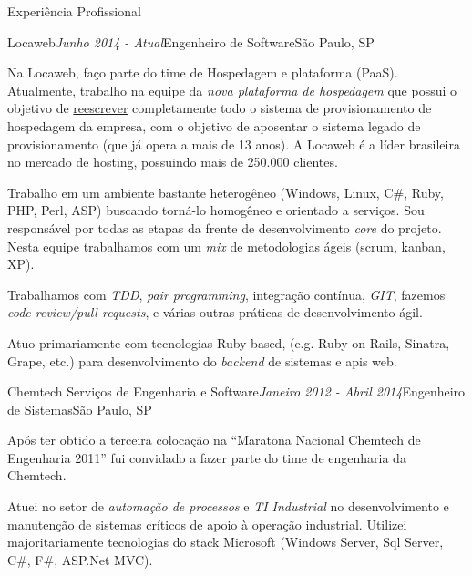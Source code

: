 \documentclass{resume} %
\begin{document}
\begin{rSection}{Experiência Profissional}
  \begin{rSubsection}{Locaweb}{\em Junho 2014 - Atual}{Engenheiro de Software}{São
      Paulo, SP}

  \item Na Locaweb, faço parte do time de Hospedagem e plataforma (PaaS).
    Atualmente, trabalho na equipe da {\em nova plataforma de hospedagem} que
    possui o objetivo de \underline{reescrever} completamente todo o sistema de
    provisionamento de hospedagem da empresa, com o objetivo de aposentar o
    sistema legado de provisionamento (que já opera a mais de 13 anos). A
    Locaweb é a líder brasileira no mercado de hosting, possuindo mais de
    250.000 clientes.

  \item Trabalho em um ambiente bastante heterogêneo (Windows, Linux, C\#, Ruby,
    PHP, Perl, ASP) buscando torná-lo homogêneo e orientado a serviços. Sou
    responsável por todas as etapas da frente de desenvolvimento {\em core} do
    projeto. Nesta equipe trabalhamos com um {\em mix} de metodologias ágeis
    (scrum, kanban, XP).

  \item Trabalhamos com {\em TDD}, {\em pair programming}, integração contínua,
    {\em GIT}, fazemos {\em code-review/pull-requests}, e várias outras práticas
    de desenvolvimento ágil.

  \item Atuo primariamente com tecnologias Ruby-based, (e.g. Ruby on Rails,
    Sinatra, Grape, etc.) para desenvolvimento do {\em backend} de sistemas e
    apis web.
  \end{rSubsection}

  \begin{rSubsection}{Chemtech Serviços de Engenharia e Software}{\em Janeiro 2012 -
      Abril 2014}{Engenheiro de Sistemas}{São Paulo, SP}

  \item Após ter obtido a terceira colocação na ``Maratona Nacional Chemtech de
    Engenharia 2011'' fui convidado a fazer parte do time de engenharia da
    Chemtech.

  \item Atuei no setor de {\em automação de processos} e {\em TI Industrial} no
    desenvolvimento e manutenção de sistemas críticos de apoio à operação
    industrial. Utilizei majoritariamente tecnologias do stack Microsoft
    (Windows Server, Sql Server, C\#, F\#, ASP.Net MVC).


\end{rSubsection}
\end{rSection}
\end{document}
